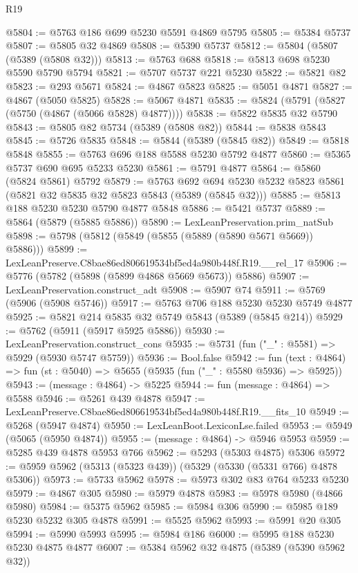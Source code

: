 \begin{lexlean}{R19}
\begin{coremodule}
@5804 := @5763 @186 @699 @5230 @5591 @4869 @5795
@5805 := @5384 @5737
@5807 := @5805 @32 @4869
@5808 := @5390 @5737
@5812 := @5804 (@5807 (@5389 (@5808 @32)))
@5813 := @5763 @688
@5818 := @5813 @698 @5230 @5590 @5790 @5794
@5821 := @5707 @5737 @221 @5230
@5822 := @5821 @82
@5823 := @293 @5671
@5824 := @4867 @5823
@5825 := @5051 @4871
@5827 := @4867 (@5050 @5825)
@5828 := @5067 @4871
@5835 := @5824 (@5791 (@5827 (@5750 (@4867 (@5066 @5828) @4877))))
@5838 := @5822 @5835 @32 @5790
@5843 := @5805 @82 @5734 (@5389 (@5808 @82))
@5844 := @5838 @5843
@5845 := @5726 @5835
@5848 := @5844 (@5389 (@5845 @82))
@5849 := @5818 @5848
@5855 := @5763 @696 @188 @5588 @5230 @5792 @4877
@5860 := @5365 @5737 @690 @695 @5233 @5230
@5861 := @5791 @4877
@5864 := @5860 (@5824 @5861) @5792
@5879 := @5763
    @692
    @694
    @5230
    @5232
    @5823
    @5861
    (@5821 @32 @5835 @32 @5823 @5843 (@5389 (@5845 @32)))
@5885 := @5813 @188 @5230 @5230 @5790 @4877 @5848
@5886 := @5421 @5737
@5889 := @5864 (@5879 (@5885 @5886))
@5890 := LexLeanPreservation.prim_natSub
@5898 := @5798 (@5812 (@5849 (@5855 (@5889 (@5890 @5671 @5669)) @5886)))
@5899 := LexLeanPreserve.C8bae86ed806619534bf5ed4a980b448f.R19.__rel_17
@5906 := @5776 (@5782 (@5898 (@5899 @4868 @5669 @5673)) @5886)
@5907 := LexLeanPreservation.construct_adt
@5908 := @5907 @74
@5911 := @5769 (@5906 (@5908 @5746))
@5917 := @5763 @706 @188 @5230 @5230 @5749 @4877
@5925 := @5821 @214 @5835 @32 @5749 @5843 (@5389 (@5845 @214))
@5929 := @5762 (@5911 (@5917 @5925 @5886))
@5930 := LexLeanPreservation.construct_cons
@5935 := @5731 (fun ("_" : @5581) => @5929 (@5930 @5747 @5759))
@5936 := Bool.false
@5942 := fun (text : @4864) => fun (st : @5040) => @5655 (@5935 (fun ("_" : @5580 @5936) => @5925))
@5943 := (message : @4864) -> @5225
@5944 := fun (message : @4864) => @5588
@5946 := @5261 @439 @4878
@5947 := LexLeanPreserve.C8bae86ed806619534bf5ed4a980b448f.R19.__fits_10
@5949 := @5268 (@5947 @4874)
@5950 := LexLeanBoot.LexiconLse.failed
@5953 := @5949 (@5065 (@5950 @4874))
@5955 := (message : @4864) -> @5946 @5953
@5959 := @5285 @439 @4878 @5953 @766
@5962 := @5293 (@5303 @4875) @5306
@5972 := @5959 @5962 (@5313 (@5323 @439)) (@5329 (@5330 (@5331 @766) @4878 @5306))
@5973 := @5733 @5962
@5978 := @5973 @302 @83 @764 @5233 @5230
@5979 := @4867 @305
@5980 := @5979 @4878
@5983 := @5978 @5980 (@4866 @5980)
@5984 := @5375 @5962
@5985 := @5984 @306
@5990 := @5985 @189 @5230 @5232 @305 @4878
@5991 := @5525 @5962
@5993 := @5991 @20 @305
@5994 := @5990 @5993
@5995 := @5984 @186
@6000 := @5995 @188 @5230 @5230 @4875 @4877
@6007 := @5384 @5962 @32 @4875 (@5389 (@5390 @5962 @32))

\end{coremodule}
\end{lexlean}
